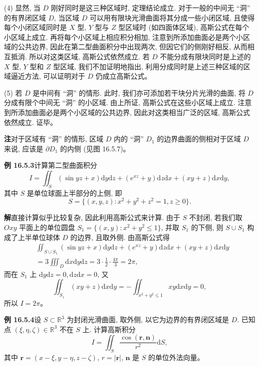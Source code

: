 \documentclass[UTF8,12pt,a4paper,fontset=fandol]{ctexart}
\begin{document}
(4) 显然, 当 $D$ 刚好同时是这三种区域时, 定理结论成立. 对于一般的中间无 ``洞'' 的有界闭区域 $D$, 当区域 $D$ 可以用有限块光滑曲面将其分成一些小闭区域, 且使得每个小闭区域同时是 $X$ 型, $Y$ 型与 $Z$ 型区域时 (如四面体区域), 高斯公式在每个小区域上成立. 再将每个小区域上相应积分相加, 注意到所添加曲面必是两个小区域的公共边界, 因此在第二型曲面积分中出现两次, 但因它们的侧刚好相反, 从而相互抵消. 所以对这类区域, 高斯公式依然成立. 若 $D$ 不能分成有限块同时是上述的 $X$ 型, $Y$ 型和 $Z$ 型区域, 我们不加证明地指出, 利用分成同时是上述三种区域的区域逼近方法, 可以证明对于 $D$ 仍成立高斯公式。

(5) 若 $D$ 是中间有 ``洞'' 的情形. 此时, 我们亦可添加若干块分片光滑的曲面, 将 $D$ 分成有限个中间无 ``洞'' 的小区域. 由上所证, 高斯公式在这些小区域上成立. 注意到所添加曲面必是两个小区域的公共边界, 因此对这类相当广泛的区域, 高斯公式依然成立. 证毕。

\noindent\textbf{注}\quad 对于区域有 ``洞'' 的情形, 区域 $D$ 内的 ``洞'' $D_1$ 的边界曲面的侧相对于区域 $D$ 来说, 应该是 $\partial D_1$ 的内侧 (见图 16.5.7)。

\noindent\textbf{例 16.5.3}\quad 计算第二型曲面积分
\[
  I=\iint_S(\sin yz+x)\mathrm dy\mathrm dz+(e^{xz}+y)\mathrm dz\mathrm dx+(xy+z)\mathrm dx\mathrm dy,
\]
其中 $S$ 是单位球面上半部分的上侧, 即
\[
  S=\{(x,y,z):x^2+y^2+z^2=1,z\geqslant0\}.
\]

\noindent\textbf{解}\quad 直接计算似乎比较复杂, 因此利用高斯公式来计算. 由于 $S$ 不封闭, 若我们取 $Oxy$ 平面上的单位圆盘 $S_1=\{(x,y):x^2+y^2\leqslant1\}$, 并取 $S_1$ 的下侧, 则 $S\cup S_1$ 构成了上半单位球体 $D$ 的边界, 且取外侧. 由高斯公式得
\[
\begin{aligned}
  &\iint_{S\cup S_1}(\sin yz+x)\mathrm dy\mathrm dz+(e^{xz}+y)\mathrm dz\mathrm dx+(xy+z)\mathrm dx\mathrm dy\\
  &=3\iiint_D\mathrm dx\mathrm dy\mathrm dz
    =3\cdot\frac12\cdot\frac{4\pi}{3}=2\pi,
\end{aligned}
\]
而在 $S_1$ 上 $\mathrm dy\mathrm dz=0,\mathrm dz\mathrm dx=0$, 又
\[
  \iint_{S_1}(xy+z)\mathrm dx\mathrm dy
  =-\iint_{x^2+y^2\leqslant1}xy\mathrm dx\mathrm dy=0,
\]
所以 $I=2\pi$。

\noindent\textbf{例 16.5.4}\quad 设 $S\subset\mathbb R^3$ 为封闭光滑曲面, 取外侧, 以它为边界的有界闭区域是 $D$. 已知点 $(\xi,\eta,\zeta)\in\mathbb R^3$ 不在 $S$ 上. 计算高斯积分
\[
  I=\iint_S\frac{\cos(\boldsymbol r,\boldsymbol n)}{r^2}\mathrm dS,
\]
其中 $\boldsymbol r=(x-\xi,y-\eta,z-\zeta)$, $r=|\boldsymbol r|$, $\boldsymbol n$ 是 $S$ 的单位外法向量。
\end{document}
